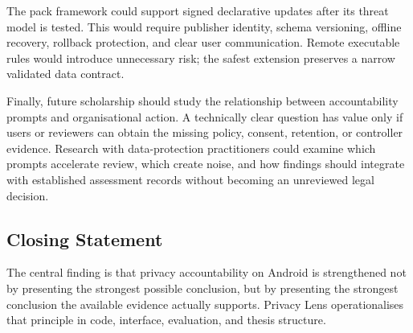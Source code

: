 The pack framework could support signed declarative updates after its threat model is tested. This would require publisher identity, schema versioning, offline recovery, rollback protection, and clear user communication. Remote executable rules would introduce unnecessary risk; the safest extension preserves a narrow validated data contract.

Finally, future scholarship should study the relationship between accountability prompts and organisational action. A technically clear question has value only if users or reviewers can obtain the missing policy, consent, retention, or controller evidence. Research with data-protection practitioners could examine which prompts accelerate review, which create noise, and how findings should integrate with established assessment records without becoming an unreviewed legal decision.

\subsection{Closing Statement}

The central finding is that privacy accountability on Android is strengthened not by presenting the strongest possible conclusion, but by presenting the strongest conclusion the available evidence actually supports. Privacy Lens operationalises that principle in code, interface, evaluation, and thesis structure.
